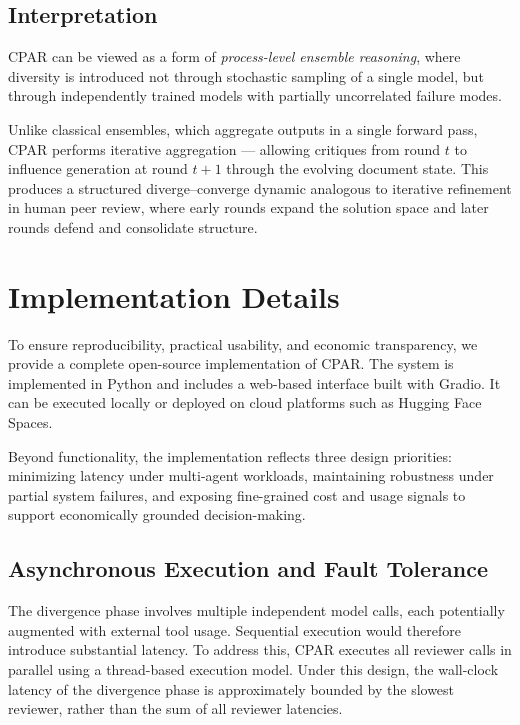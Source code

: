 \documentclass[11pt, a4paper]{article}
\begin{document}
\subsection{Interpretation}

CPAR can be viewed as a form of \textit{process-level ensemble reasoning}, where diversity is introduced not through stochastic sampling of a single model, but through independently trained models with partially uncorrelated failure modes.

Unlike classical ensembles, which aggregate outputs in a single forward pass, CPAR performs iterative aggregation --- allowing critiques from round $t$ to influence generation at round $t+1$ through the evolving document state. This produces a structured diverge--converge dynamic analogous to iterative refinement in human peer review, where early rounds expand the solution space and later rounds defend and consolidate structure.

\section{Implementation Details}
\label{sec:implementation}

To ensure reproducibility, practical usability, and economic transparency, we provide a complete open-source implementation of CPAR. The system is implemented in Python and includes a web-based interface built with Gradio. It can be executed locally or deployed on cloud platforms such as Hugging Face Spaces.

Beyond functionality, the implementation reflects three design priorities: minimizing latency under multi-agent workloads, maintaining robustness under partial system failures, and exposing fine-grained cost and usage signals to support economically grounded decision-making.

\subsection{Asynchronous Execution and Fault Tolerance}

The divergence phase involves multiple independent model calls, each potentially augmented with external tool usage. Sequential execution would therefore introduce substantial latency. To address this, CPAR executes all reviewer calls in parallel using a thread-based execution model. Under this design, the wall-clock latency of the divergence phase is approximately bounded by the slowest reviewer, rather than the sum of all reviewer latencies.
\end{document}
